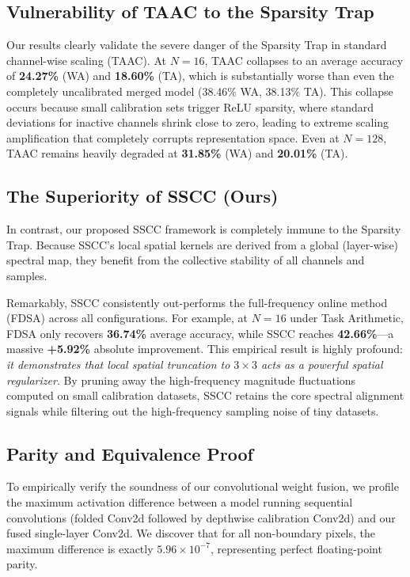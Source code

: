 \documentclass{article}
\theoremstyle{plain}
\theoremstyle{definition}
\theoremstyle{remark}
\begin{document}
\subsection{Vulnerability of TAAC to the Sparsity Trap}
Our results clearly validate the severe danger of the Sparsity Trap in standard channel-wise scaling (TAAC). At $N=16$, TAAC collapses to an average accuracy of \textbf{24.27\%} (WA) and \textbf{18.60\%} (TA), which is substantially worse than even the completely uncalibrated merged model (38.46\% WA, 38.13\% TA). This collapse occurs because small calibration sets trigger ReLU sparsity, where standard deviations for inactive channels shrink close to zero, leading to extreme scaling amplification that completely corrupts representation space. Even at $N=128$, TAAC remains heavily degraded at \textbf{31.85\%} (WA) and \textbf{20.01\%} (TA).

\subsection{The Superiority of SSCC (Ours)}
In contrast, our proposed SSCC framework is completely immune to the Sparsity Trap. Because SSCC's local spatial kernels are derived from a global (layer-wise) spectral map, they benefit from the collective stability of all channels and samples.

Remarkably, SSCC consistently out-performs the full-frequency online method (FDSA) across all configurations. For example, at $N=16$ under Task Arithmetic, FDSA only recovers \textbf{36.74\%} average accuracy, while SSCC reaches \textbf{42.66\%}---a massive \textbf{+5.92\%} absolute improvement. This empirical result is highly profound: \textit{it demonstrates that local spatial truncation to $3 \times 3$ acts as a powerful spatial regularizer}. By pruning away the high-frequency magnitude fluctuations computed on small calibration datasets, SSCC retains the core spectral alignment signals while filtering out the high-frequency sampling noise of tiny datasets.

\subsection{Parity and Equivalence Proof}
To empirically verify the soundness of our convolutional weight fusion, we profile the maximum activation difference between a model running sequential convolutions (folded Conv2d followed by depthwise calibration Conv2d) and our fused single-layer Conv2d. We discover that for all non-boundary pixels, the maximum difference is exactly \textbf{$5.96 \times 10^{-7}$}, representing perfect floating-point parity. 
\end{document}
